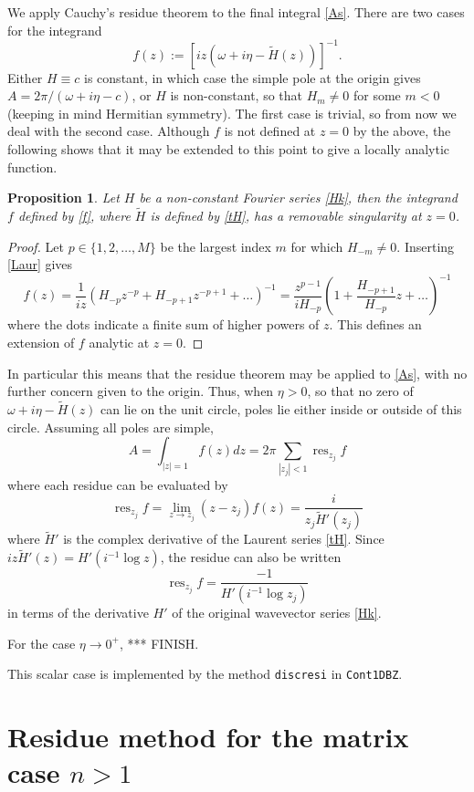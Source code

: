 \documentclass[11pt]{article}
\newcommand{\be}{\begin{equation}}
\newcommand{\ee}{\end{equation}}
\DeclareMathOperator{\res}{res}
\newtheorem{pro}[thm]{Proposition}
\newcommand{\om}{\omega}
\newcommand{\tH}{\tilde H}
\begin{document}
We apply Cauchy's residue theorem to the final integral \eqref{As}.
There are two cases for
the integrand
\be
f(z) := [iz(\om+ i\eta - \tH(z))]^{-1}.
\label{f}
\ee
Either $H\equiv c$ is constant, in which case the simple pole at the
origin gives
$A = 2\pi / (\om+i\eta-c)$, or $H$ is non-constant, so that
$H_m\neq 0$ for some $m<0$ (keeping in mind Hermitian symmetry).
The first case is trivial, so from now we deal with the second case.
Although $f$ is not defined at $z=0$ by the above, the following shows that
it may be extended to this point to give a locally analytic function.
\begin{pro}
  Let $H$ be a non-constant Fourier series \eqref{Hk}, then
  the integrand $f$ defined by \eqref{f}, where $\tH$ is defined by
  \eqref{tH}, has a removable singularity at $z=0$.
\end{pro}
\begin{proof}
  Let $p \in \{1,2, \dots, M\}$
  be the largest index $m$ for which $H_{-m} \neq 0$.
  Inserting \eqref{Laur} gives
  $$
  f(z) = \frac{1}{iz}\left( H_{-p}z^{-p} + H_{-p+1}z^{-p+1} + \dots \right)^{-1}
  =
  \frac{z^{p-1}}{iH_{-p}}\left( 1 + \frac{H_{-p+1}}{H_{-p}}z + \dots \right)^{-1}
  $$
  where the dots indicate a finite sum of higher powers of $z$.
  This defines an extension of $f$ analytic at $z=0$.
\end{proof}
In particular this means that the residue theorem may be applied to
\eqref{As}, with no further concern given to the origin.
Thus, when $\eta>0$, so that no zero of $\om + i\eta - \tH(z)$ can lie
on the unit circle, poles lie either inside or outside of this circle.
Assuming all poles are simple,
\be
A = \int_{|z|=1} f(z) dz = 2\pi \sum_{|z_j|<1} \res_{z_j} f
\ee
where each residue can be evaluated by
\be
\res_{z_j} f = \lim_{z\to z_j} (z-z_j)f(z) = \frac{i}{z_j \tH'(z_j)}
\label{res}
\ee
where $\tH'$ is the complex derivative of the Laurent series \eqref{tH}.
Since $iz\tH'(z) = H'(i^{-1}\log z)$, the residue can
also be written
\be
\res_{z_j} f  = \frac{-1}{H'(i^{-1}\log z_j)}
\ee
in terms of the derivative $H'$ of the original wavevector series \eqref{Hk}.

For the case $\eta\to0^+$,
***
FINISH.


This scalar case is implemented by the method \texttt{discresi} in
\texttt{Cont1DBZ}.



\section{Residue method for the matrix case $n>1$}









\end{document}
